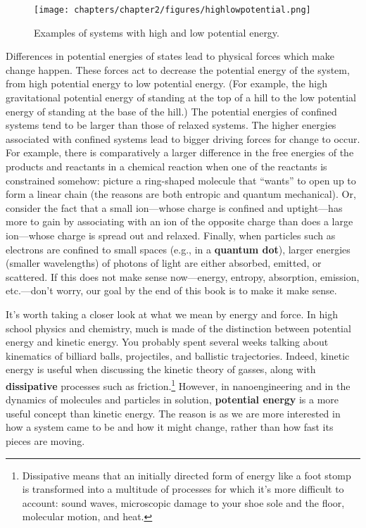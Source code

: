 \begin{figure}[h!]
\centering
  \texttt{[image: chapters/chapter2/figures/highlowpotential.png]}
  \caption{Examples of systems with high and low potential energy.}
  \label{fig:highlowpotential}
\end{figure}

Differences in potential energies of states lead to physical forces which make change happen. These forces act to decrease the potential energy of the system, from high potential energy to low potential energy. (For example, the high gravitational potential energy of standing at the top of a hill to the low potential energy of standing at the base of the hill.) The potential energies of confined systems tend to be larger than those of relaxed systems. The higher energies associated with confined systems lead to bigger driving forces for change to occur. For example, there is comparatively a larger difference in the free energies of the products and reactants in a chemical reaction when one of the reactants is constrained somehow: picture a ring-shaped molecule that ``wants'' to open up to form a linear chain (the reasons are both entropic and quantum mechanical). Or, consider the fact that a small ion---whose charge is confined and uptight---has more to gain by associating with an ion of the opposite charge than does a large ion---whose charge is spread out and relaxed. Finally, when particles such as electrons are confined to small spaces (e.g., in a \textbf{quantum dot}), larger energies (smaller wavelengths) of photons of light are either absorbed, emitted, or scattered. If this does not make sense now---energy, entropy, absorption, emission, etc.---don’t worry, our goal by the end of this book is to make it make sense.

It’s worth taking a closer look at what we mean by energy and force. In high school physics and chemistry, much is made of the distinction between potential energy and kinetic energy. You probably spent several weeks talking about kinematics of billiard balls, projectiles, and ballistic trajectories. Indeed, kinetic energy is useful when discussing the kinetic theory of gasses, along with \textbf{dissipative} processes such as friction.\footnote{Dissipative means that an initially directed form of energy like a foot stomp is transformed into a multitude of processes for which it's more difficult to account: sound waves, microscopic damage to your shoe sole and the floor, molecular motion, and heat.} However, in nanoengineering and in the dynamics of molecules and particles in solution, \textbf{potential energy} is a more useful concept than kinetic energy. The reason is as we are more interested in how a system came to be and how it might change, rather than how fast its pieces are moving. 

